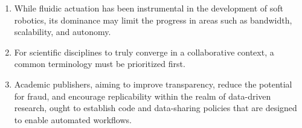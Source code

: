 \documentclass[a5paper]{article}
\begin{document}
\begin{enumerate}
  \item While fluidic actuation has been instrumental in the development of soft robotics, its dominance may limit the progress in areas such as bandwidth, scalability, and autonomy.

  \item For scientific disciplines to truly converge in a collaborative context, a common terminology must be prioritized first.

  \item Academic publishers, aiming to improve transparency, reduce the potential for fraud, and encourage replicability within the realm of data-driven research, ought to establish code and data-sharing policies that are designed to enable automated workflows.


\end{enumerate}
\end{document}
